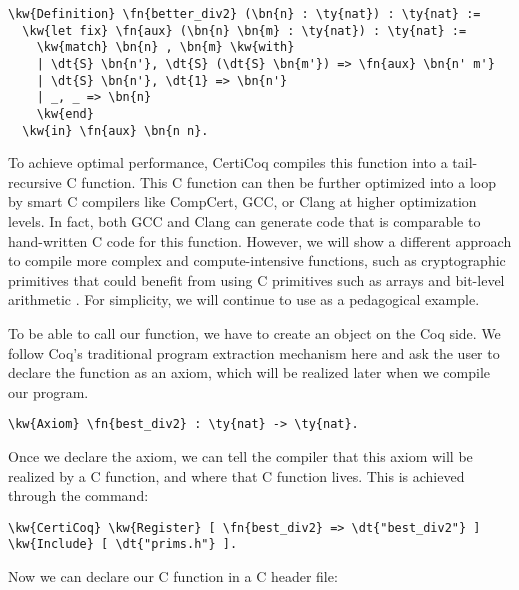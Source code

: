 \begin{Verbatim}
\kw{Definition} \fn{better_div2} (\bn{n} : \ty{nat}) : \ty{nat} :=
  \kw{let fix} \fn{aux} (\bn{n} \bn{m} : \ty{nat}) : \ty{nat} :=
    \kw{match} \bn{n} , \bn{m} \kw{with}
    | \dt{S} \bn{n'}, \dt{S} (\dt{S} \bn{m'}) => \fn{aux} \bn{n' m'}
    | \dt{S} \bn{n'}, \dt{1} => \bn{n'}
    | _, _ => \bn{n}
    \kw{end}
  \kw{in} \fn{aux} \bn{n n}.
\end{Verbatim}

To achieve optimal performance, CertiCoq compiles this function into a tail-recursive C function. This C function can then be further optimized into a loop by smart C compilers like CompCert, GCC, or Clang at higher optimization levels. In fact, both GCC and Clang can generate code that is comparable to hand-written C code for this function. 
However, we will show a different approach to compile more complex and compute-intensive functions, such as cryptographic primitives that could benefit from using C primitives such as arrays and bit-level arithmetic  \cite{appel2015sha256}. For simplicity, we will continue to use  as a pedagogical example.

To be able to call our function, we have to create an object on the Coq side. We follow Coq's traditional program extraction mechanism here and ask the user to declare the function as an axiom, which will be realized later when we compile our program.

\begin{Verbatim}
\kw{Axiom} \fn{best_div2} : \ty{nat} -> \ty{nat}.
\end{Verbatim}

Once we declare the axiom, we can tell the compiler that this axiom will be realized by a C function, and where that C function lives. This is achieved through the  command:

\begin{Verbatim}
\kw{CertiCoq} \kw{Register} [ \fn{best_div2} => \dt{"best_div2"} ] \kw{Include} [ \dt{"prims.h"} ].
\end{Verbatim}

Now we can declare our C function in a C header file:

